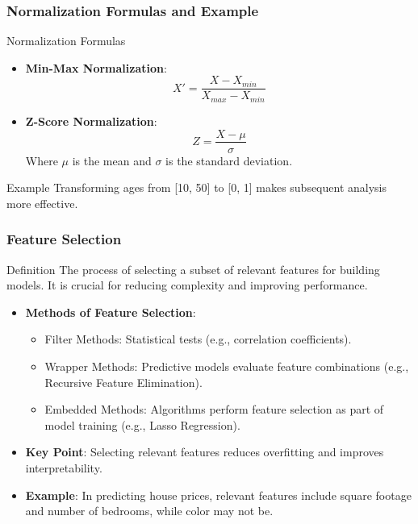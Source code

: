 \documentclass{beamer}
\begin{document}
\begin{frame}[fragile]
    \frametitle{Normalization Formulas and Example}

    \begin{block}{Normalization Formulas}
        \begin{itemize}
            \item \textbf{Min-Max Normalization}:
            \begin{equation}
            X' = \frac{X - X_{min}}{X_{max} - X_{min}}
            \end{equation}

            \item \textbf{Z-Score Normalization}:
            \begin{equation}
            Z = \frac{X - \mu}{\sigma}
            \end{equation}
            Where \( \mu \) is the mean and \( \sigma \) is the standard deviation.
        \end{itemize}
    \end{block}

    \begin{block}{Example}
        Transforming ages from [10, 50] to [0, 1] makes subsequent analysis more effective.
    \end{block}
\end{frame}

\begin{frame}[fragile]
    \frametitle{Feature Selection}

    \begin{block}{Definition}
        The process of selecting a subset of relevant features for building models. It is crucial for reducing complexity and improving performance.
    \end{block}

    \begin{itemize}
        \item \textbf{Methods of Feature Selection}:
        \begin{itemize}
            \item Filter Methods: Statistical tests (e.g., correlation coefficients).
            \item Wrapper Methods: Predictive models evaluate feature combinations (e.g., Recursive Feature Elimination).
            \item Embedded Methods: Algorithms perform feature selection as part of model training (e.g., Lasso Regression).
        \end{itemize}
        \item \textbf{Key Point}: Selecting relevant features reduces overfitting and improves interpretability.
        \item \textbf{Example}: In predicting house prices, relevant features include square footage and number of bedrooms, while color may not be.
    \end{itemize}
\end{frame}
\end{document}
